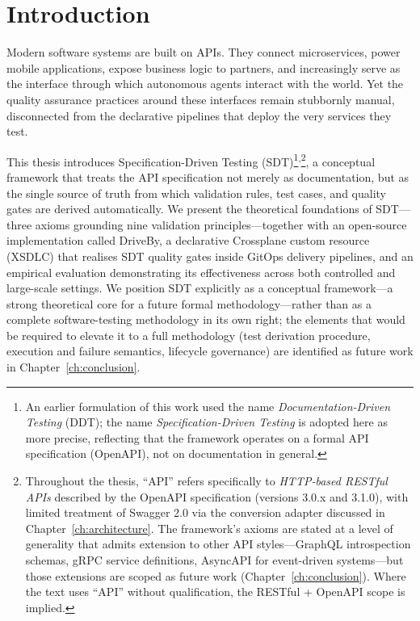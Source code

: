 \chapter{Introduction}
\label{ch:introduction}

Modern software systems are built on APIs. They connect microservices, power mobile applications, expose business logic to partners, and increasingly serve as the interface through which autonomous agents interact with the world. Yet the quality assurance practices around these interfaces remain stubbornly manual, disconnected from the declarative pipelines that deploy the very services they test.

This thesis introduces Specification-Driven Testing (SDT)\footnote{An earlier formulation of this work used the name \textit{Documentation-Driven Testing} (DDT); the name \textit{Specification-Driven Testing} is adopted here as more precise, reflecting that the framework operates on a formal API specification (OpenAPI), not on documentation in general.}\textsuperscript{,}\footnote{Throughout the thesis, ``API'' refers specifically to \emph{HTTP-based RESTful APIs} described by the OpenAPI specification (versions 3.0.x and 3.1.0), with limited treatment of Swagger 2.0 via the conversion adapter discussed in Chapter~\ref{ch:architecture}. The framework's axioms are stated at a level of generality that admits extension to other API styles---GraphQL introspection schemas, gRPC service definitions, AsyncAPI for event-driven systems---but those extensions are scoped as future work (Chapter~\ref{ch:conclusion}). Where the text uses ``API'' without qualification, the RESTful + OpenAPI scope is implied.}, a conceptual framework that treats the API specification not merely as documentation, but as the single source of truth from which validation rules, test cases, and quality gates are derived automatically. We present the theoretical foundations of SDT---three axioms grounding nine validation principles---together with an open-source implementation called DriveBy, a declarative Crossplane custom resource (XSDLC) that realises SDT quality gates inside GitOps delivery pipelines, and an empirical evaluation demonstrating its effectiveness across both controlled and large-scale settings. We position SDT explicitly as a conceptual framework---a strong theoretical core for a future formal methodology---rather than as a complete software-testing methodology in its own right; the elements that would be required to elevate it to a full methodology (test derivation procedure, execution and failure semantics, lifecycle governance) are identified as future work in Chapter~\ref{ch:conclusion}.

